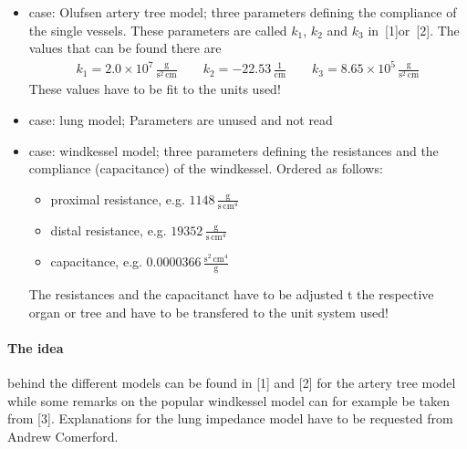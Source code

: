 \begin{itemize}
 \item case: Olufsen artery tree model; three parameters defining the compliance
       of the single vessels. These parameters are called $k_1$, $k_2$ and $k_3$
       in~[1]or~[2]. The values that can be found there
       are
       \begin{align*}
        k_1 = 2.0 \times 10^7 \, \frac{\mathrm{g}}{\mathrm{s^2\, cm}} \qquad
        k_2 = -22.53 \,\frac{1}{\mathrm{cm}} \qquad
        k_3 = 8.65 \times 10^5 \, \frac{\mathrm{g}}{\mathrm{s^2\, cm}}
       \end{align*}
       These values have to be fit to the units used!
 \item case: lung model; Parameters are unused and not read
 \item case: windkessel model; three parameters defining the resistances and the
       compliance (capacitance) of the windkessel. Ordered as follows:
       \begin{itemize}
         \item proximal resistance, e.g. $1148\,\frac{\mathrm{g}}{\mathrm{s\, cm^4}}$
         \item distal resistance, e.g. $19352\,\frac{\mathrm{g}}{\mathrm{s\, cm^4}}$
         \item capacitance, e.g. $0.0000366\,\frac{\mathrm{s^2\,cm^4}}{\mathrm{g}}$
       \end{itemize}
       The resistances and the capacitanct have to be adjusted t the respective organ
       or tree and have to be transfered to the unit system used!
\end{itemize}

\paragraph{The idea} behind the different models can be found in [1] and [2] for the artery
tree model while some remarks on the popular windkessel model can for example be taken from [3].
Explanations for the lung impedance model have to be requested from Andrew Comerford.

